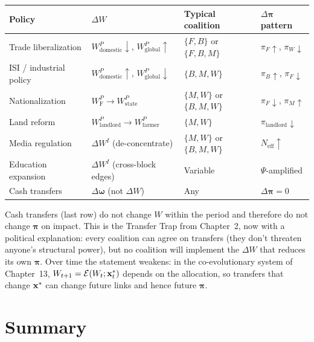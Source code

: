\documentclass[../structural_economics_book.tex]{subfiles}
\begin{document}
\begin{definition}\label{ch14:prop:policy_coalition}
\begin{center}
\begin{tabularx}{\textwidth}{LLLL}
\toprule
\textbf{Policy} & \textbf{$\Delta W$} & \textbf{Typical coalition} & \textbf{$\Delta\boldsymbol{\pi}$ pattern} \\
\midrule
Trade liberalization & $W^P_{\text{domestic}} \downarrow$, $W^P_{\text{global}} \uparrow$ & $\{F, B\}$ or $\{F, B, M\}$ & $\pi_F \uparrow$, $\pi_W \downarrow$ \\
ISI / industrial policy & $W^P_{\text{domestic}} \uparrow$, $W^P_{\text{global}} \downarrow$ & $\{B, M, W\}$ & $\pi_B \uparrow$, $\pi_F \downarrow$ \\
Nationalization & $W^P_{\text{F}} \to W^P_{\text{state}}$ & $\{M, W\}$ or $\{B, M, W\}$ & $\pi_F \downarrow$, $\pi_M \uparrow$ \\
Land reform & $W^P_{\text{landlord}} \to W^P_{\text{farmer}}$ & $\{M, W\}$ & $\pi_{\text{landlord}} \downarrow$ \\
Media regulation & $\Delta W^I$ (de-concentrate) & $\{M, W\}$ or $\{B, M, W\}$ & $N_{\text{eff}} \uparrow$ \\
Education expansion & $\Delta W^I$ (cross-block edges) & Variable & $\Psi$-amplified \\
Cash transfers & $\Delta\boldsymbol{\omega}$ (not $\Delta W$) & Any & $\Delta\boldsymbol{\pi} = 0$ \\
\bottomrule
\end{tabularx}
\end{center}
\end{definition}

Cash transfers (last row) do not change $W$ within the period and therefore do not change $\boldsymbol{\pi}$ on impact. This is the Transfer Trap from Chapter~2, now with a political explanation: every coalition can agree on transfers (they don't threaten anyone's structural power), but no coalition will implement the $\Delta W$ that reduces its own $\boldsymbol{\pi}$. Over time the statement weakens: in the co-evolutionary system of Chapter~13, $W_{t+1} = \mathcal{E}(W_t; \mathbf{x}^*_t)$ depends on the allocation, so transfers that change $\mathbf{x}^*$ can change future links and hence future $\boldsymbol{\pi}$.


\section{Summary}
\label{ch14:sec:summary}
\end{document}
